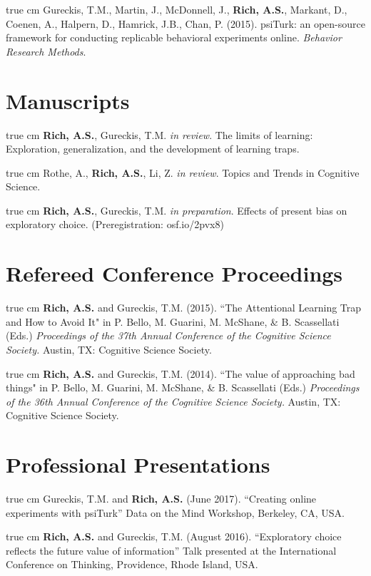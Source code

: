 \documentclass[12pt]{my_cv}
\def\ind{\hangindent=1 true cm\hangafter=1 \noindent}
\begin{document}
\ind Gureckis, T.M., Martin, J., McDonnell, J., \textbf{Rich, A.S.}, Markant,
D., Coenen, A., Halpern, D., Hamrick, J.B., Chan, P. (2015). psiTurk: an
open-source framework for conducting replicable behavioral experiments online.
\emph{Behavior Research Methods}.

\section{Manuscripts}

\ind \textbf{Rich, A.S.}, Gureckis, T.M. \emph{in review}. The limits of learning:
Exploration, generalization, and the development of learning traps.

\ind Rothe, A., \textbf{Rich, A.S.}, Li, Z. \emph{in review}. Topics and Trends in
Cognitive Science.

\ind \textbf{Rich, A.S.}, Gureckis, T.M. \emph{in preparation}. Effects of
present bias on exploratory choice. (Preregistration: osf.io/2pvx8)

\section{Refereed Conference Proceedings}

\ind \textbf{Rich, A.S.} and Gureckis, T.M. (2015). ``The Attentional Learning Trap and How to Avoid It" in P. Bello, M. Guarini, M. McShane, \& B. Scassellati (Eds.) \emph{Proceedings of the 37th Annual Conference of the Cognitive Science Society.} Austin, TX: Cognitive Science Society.	

\ind \textbf{Rich, A.S.} and Gureckis, T.M. (2014). ``The value of approaching bad things" in P. Bello, M. Guarini, M. McShane, \& B. Scassellati (Eds.) \emph{Proceedings of the 36th Annual Conference of the Cognitive Science Society.} Austin, TX: Cognitive Science Society.	

\section{Professional Presentations}

\ind Gureckis, T.M. and \textbf{Rich, A.S.} (June 2017). ``Creating online
experiments with psiTurk'' Data on the Mind Workshop, Berkeley, CA, USA.

\ind \textbf{Rich, A.S.} and Gureckis, T.M. (August 2016). ``Exploratory choice
reflects the future value of information'' Talk presented at the International
Conference on Thinking, Providence, Rhode Island, USA.
\end{document}
